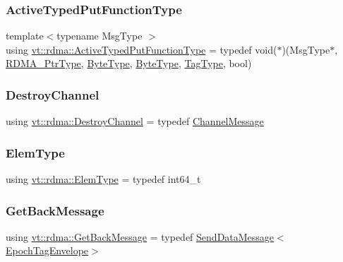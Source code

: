 \subsubsection{\texorpdfstring{Active\+Typed\+Put\+Function\+Type}{ActiveTypedPutFunctionType}}
{\footnotesize\ttfamily template$<$typename Msg\+Type $>$ \\
using \hyperlink{namespacevt_1_1rdma_a56f7eb7ecfa7e6824d3abb4afb634a37}{vt\+::rdma\+::\+Active\+Typed\+Put\+Function\+Type} = typedef void($\ast$)(Msg\+Type$\ast$, \hyperlink{namespacevt_a9e2c953286c7616f7c218e9951790776}{R\+D\+M\+A\+\_\+\+Ptr\+Type}, \hyperlink{namespacevt_aab8d55968084610ce3b17057981e9300}{Byte\+Type}, \hyperlink{namespacevt_aab8d55968084610ce3b17057981e9300}{Byte\+Type}, \hyperlink{namespacevt_a84ab281dae04a52a4b243d6bf62d0e52}{Tag\+Type}, bool)}

\mbox{\label{namespacevt_1_1rdma_a1273aeddd73c1ffac0d7383ef7a314d8}} 
\subsubsection{\texorpdfstring{Destroy\+Channel}{DestroyChannel}}
{\footnotesize\ttfamily using \hyperlink{namespacevt_1_1rdma_a1273aeddd73c1ffac0d7383ef7a314d8}{vt\+::rdma\+::\+Destroy\+Channel} = typedef \hyperlink{structvt_1_1rdma_1_1_channel_message}{Channel\+Message}}

\mbox{\label{namespacevt_1_1rdma_a38e310504e675aa1bcaf7811019b0df2}} 
\subsubsection{\texorpdfstring{Elem\+Type}{ElemType}}
{\footnotesize\ttfamily using \hyperlink{namespacevt_1_1rdma_a38e310504e675aa1bcaf7811019b0df2}{vt\+::rdma\+::\+Elem\+Type} = typedef int64\+\_\+t}

\mbox{\label{namespacevt_1_1rdma_a72a94b92eba75ec9fec43b2a9a4ad878}} 
\subsubsection{\texorpdfstring{Get\+Back\+Message}{GetBackMessage}}
{\footnotesize\ttfamily using \hyperlink{namespacevt_1_1rdma_a72a94b92eba75ec9fec43b2a9a4ad878}{vt\+::rdma\+::\+Get\+Back\+Message} = typedef \hyperlink{structvt_1_1rdma_1_1_send_data_message}{Send\+Data\+Message}$<$\hyperlink{namespacevt_af23b58014ced6898422213a0e5e6a27a}{Epoch\+Tag\+Envelope}$>$}

